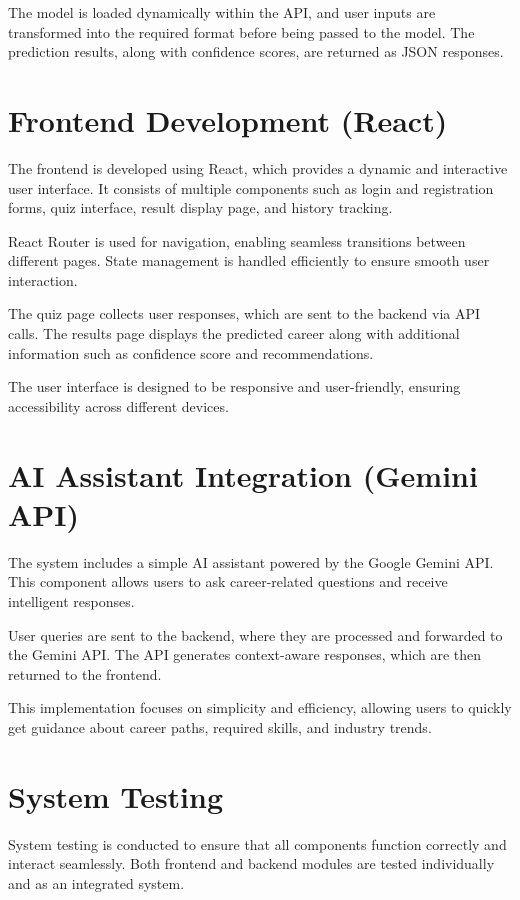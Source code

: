 \documentclass[12pt,a4paper]{report}
\begin{document}
{The model is loaded dynamically within the API, and user inputs are transformed into the required format before being passed to the model. The prediction results, along with confidence scores, are returned as JSON responses.

\section{Frontend Development (React)}

The frontend is developed using React, which provides a dynamic and interactive user interface. It consists of multiple components such as login and registration forms, quiz interface, result display page, and history tracking.

React Router is used for navigation, enabling seamless transitions between different pages. State management is handled efficiently to ensure smooth user interaction.

The quiz page collects user responses, which are sent to the backend via API calls. The results page displays the predicted career along with additional information such as confidence score and recommendations.

The user interface is designed to be responsive and user-friendly, ensuring accessibility across different devices.

\section{AI Assistant Integration (Gemini API)}

The system includes a simple AI assistant powered by the Google Gemini API. This component allows users to ask career-related questions and receive intelligent responses.

User queries are sent to the backend, where they are processed and forwarded to the Gemini API. The API generates context-aware responses, which are then returned to the frontend.

This implementation focuses on simplicity and efficiency, allowing users to quickly get guidance about career paths, required skills, and industry trends.

\section{System Testing}

System testing is conducted to ensure that all components function correctly and interact seamlessly. Both frontend and backend modules are tested individually and as an integrated system.

}
\end{document}
